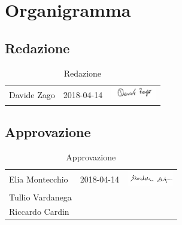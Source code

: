 \section{Organigramma}
	\subsection{Redazione}
	\begin{table}[H]
	\centering
	\begin{tabular}{|p{4cm}|C{4cm}|C{5cm}|}
	\hline
		 & & \\
		\hline
		Davide Zago & 2018-04-14 & \includegraphics[width=2cm]{../../CommonImages/firme/davide.png} \\
		\hline
	\end{tabular}
	\caption{Redazione}
	\end{table}
	
	\subsection{Approvazione}
	\begin{table}[H]
		\centering
		\begin{tabular}{|p{4cm}|C{4cm}|C{5cm}|}
			\hline
			 & & \\
			\hline			
			Elia Montecchio & 2018-04-14 & \includegraphics[width=2cm]{../../CommonImages/firme/elia.png}  \\
			\hline
			Tullio Vardanega &  &  \\
			\hline
			Riccardo Cardin &  &  \\
			\hline
		\end{tabular}
		\caption{Approvazione}
	\end{table}
	
